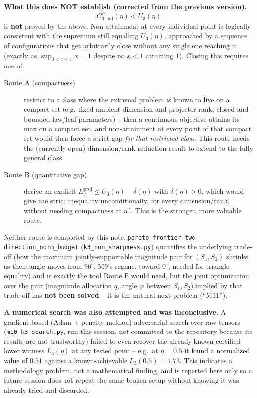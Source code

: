 \textbf{What this does NOT establish (corrected from the previous
version).}
\[
  C_{3,\mathrm{ind}}^P(\eta) < U_3(\eta)
\]
is \textbf{not} proved by the above. Non-attainment at every individual
point is logically consistent with the supremum still equalling
$U_3(\eta)$, approached by a sequence of configurations that get
arbitrarily close without any single one reaching it (exactly as
$\sup_{0<x<1}x=1$ despite no $x<1$ attaining $1$). Closing this requires
one of:
\begin{description}
  \item[Route A (compactness)] restrict to a class where the extremal
    problem is known to live on a compact set (e.g.\ fixed ambient
    dimension and projector rank, closed and bounded law/leaf
    parameters) -- then a continuous objective attains its max on a
    compact set, and non-attainment at every point of that compact set
    would then force a strict gap \emph{for that restricted class}. This
    route needs the (currently open) dimension/rank reduction result to
    extend to the fully general class.
  \item[Route B (quantitative gap)] derive an explicit
    $E_T^{\mathrm{proj}}\le U_3(\eta)-\delta(\eta)$ with $\delta(\eta)>0$,
    which would give the strict inequality unconditionally, for every
    dimension/rank, without needing compactness at all. This is the
    stronger, more valuable route.
\end{description}
Neither route is completed by this note. \texttt{pareto\_frontier\_two\_
direction\_norm\_budget} (\texttt{k3\_non\_sharpness.py}) quantifies the
underlying trade-off (how the maximum jointly-supportable magnitude pair
for $(S_1,S_2)$ shrinks as their angle moves from $90^\circ$, M9's
regime, toward $0^\circ$, needed for triangle equality) and is exactly
the tool Route B would need, but the joint optimization over the pair
(magnitude allocation $q$, angle $\varphi$ between $S_1,S_2$) implied by
that trade-off has \textbf{not been solved} -- it is the natural next
problem (``M11'').

\textbf{A numerical search was also attempted and was inconclusive.} A
gradient-based (Adam + penalty method) adversarial search over raw
tensors (\texttt{m10\_k3\_search.py}, run this session, not committed to
the repository because its results are not trustworthy) failed to even
recover the already-known certified lower witness $L_3(\eta)$ at any
tested point -- e.g.\ at $\eta=0.5$ it found a normalized value of
$0.51$ against a known-achievable $L_3(0.5)=1.73$. This indicates a
methodology problem, not a mathematical finding, and is reported here
only so a future session does not repeat the same broken setup without
knowing it was already tried and discarded.

